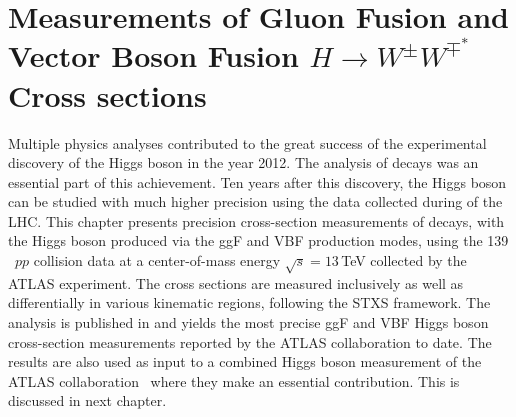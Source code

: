 \chapter[$H\rightarrow W^{\pm}W^{\mp^*}$ Cross-Section Measurements]{Measurements of Gluon Fusion and Vector Boson Fusion $H\rightarrow W^{\pm}W^{\mp^*}$ Cross sections}
\label{chap:hww}
Multiple physics analyses contributed to the great success of the experimental discovery of the Higgs boson in the year 2012. The analysis of \HWW decays was an essential part of this achievement. 
Ten years after this discovery, the Higgs boson can be studied with much higher precision using the data collected during \RunTwo of the LHC. 
This chapter presents precision cross-section measurements of \HWW decays, with the Higgs boson produced via the ggF and VBF production modes, using the 139\,\ifb\ $pp$ collision data at a center-of-mass energy $\sqrt{s} = 13\,$TeV collected by the ATLAS experiment.
The cross sections are measured inclusively as well as differentially in various kinematic regions, following the STXS framework.
The analysis is published in  and yields the most precise ggF and VBF Higgs boson cross-section measurements reported by the ATLAS collaboration to date.
The results are also used as input to a combined Higgs boson measurement of the ATLAS collaboration~\cite{NaturePaper} where they make an essential contribution. This is discussed in next chapter. 

